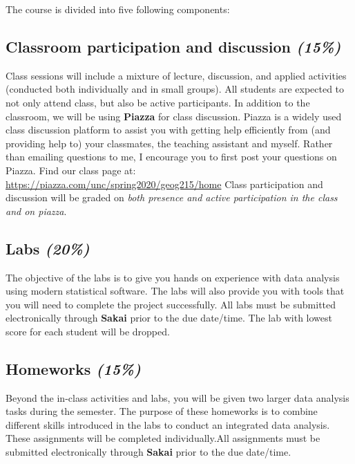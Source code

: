 \documentclass[11pt,]{article}
\begin{document}
The course is divided into five following components:

\hypertarget{classroom-participation-and-discussion-15}{%
\subsection{\texorpdfstring{Classroom participation and discussion
\emph{(15\%)}}{Classroom participation and discussion (15\%)}}\label{classroom-participation-and-discussion-15}}

Class sessions will include a mixture of lecture, discussion, and
applied activities (conducted both individually and in small groups).
All students are expected to not only attend class, but also be active
participants. In addition to the classroom, we will be using
\textbf{Piazza} for class discussion. Piazza is a widely used class
discussion platform to assist you with getting help efficiently from
(and providing help to) your classmates, the teaching assistant and
myself. Rather than emailing questions to me, I encourage you to first
post your questions on Piazza. Find our class page at:
\url{https://piazza.com/unc/spring2020/geog215/home} Class participation
and discussion will be graded on \emph{both presence and active
participation in the class and on piazza}.

\hypertarget{labs-20}{%
\subsection{\texorpdfstring{Labs
\emph{(20\%)}}{Labs (20\%)}}\label{labs-20}}

The objective of the labs is to give you hands on experience with data
analysis using modern statistical software. The labs will also provide
you with tools that you will need to complete the project successfully.
All labs must be submitted electronically through \textbf{Sakai} prior
to the due date/time. The lab with lowest score for each student will be
dropped.

\hypertarget{homeworks-15}{%
\subsection{\texorpdfstring{Homeworks
\emph{(15\%)}}{Homeworks (15\%)}}\label{homeworks-15}}

Beyond the in-class activities and labs, you will be given two larger
data analysis tasks during the semester. The purpose of these homeworks
is to combine different skills introduced in the labs to conduct an
integrated data analysis. These assignments will be completed
individually.All assignments must be submitted electronically through
\textbf{Sakai} prior to the due date/time.
\end{document}
